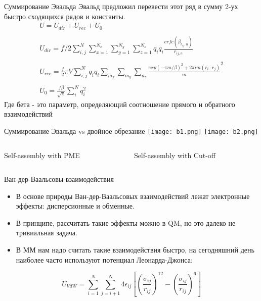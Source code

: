 \begin{frame}{Суммирование Эвальда}{}
Эвальд предложил перевести этот ряд в сумму 2-ух быстро сходящихся рядов и константы.
\[
    \begin{array}{l}
	U=U_{dir} + U_{rec} +U_0   \\
    \\
 U_{dir}=f/2 \sum_{i,j}^{N} \sum_{x=1}^{N_x}  \sum_{y=1}^{N_y}  \sum_{z=1}^{N_z} {q_i q_i \frac{erfc(\beta_{r_{ij},n})}{r_{ij,n}}}  \\
 \\
 U_{rec}= \frac{f}{2}\pi V \sum_{i,j}^{N}  q_i q_i \sum_{m_x} \sum_{m_y} \sum_{n_z} {\frac{exp(-\pi m/\beta )^2 +2 \pi i m (r_i \cdot r_j)}m^2} \\
 \\
U_0=\frac{f \beta}{\sqrt{\pi}} \sum_{i}^{N} q_{i}^2 
\end{array}
\]
Где бета - это параметр, определяющий соотношение прямого и обратного взаимодействий
\end{frame}


\begin{frame}{Суммирование Эвальда vs двойное обрезание}
\texttt{[image: b1.png]}
\texttt{[image: b2.png]}
\begin{columns}
\begin{column}{0.5\textwidth}
Self-assembly with PME
\end{column}
\begin{column}{0.5\textwidth} 
Self-assembly  with Cut-off
\end{column}
\end{columns}
\end{frame}

\begin{frame}{Ван-дер-Ваальсовы взаимодействия}
 \begin{itemize}
  \item
В основе природы Ван-дер-Ваальсовых взаимодействий лежат электронные эффекты: дисперсионные и обменные. 
\vspace{0.2cm}
  \item
В принципе, рассчитать такие эффекты можно в QM, но это далеко не тривиальная задача. 
\vspace{0.2cm}
  \item
В ММ нам надо считать такие взаимодействия быстро, на сегодняшний день наиболее часто используют потенциал Леонарда-Джонса:
\vspace{0.2cm}
  \end{itemize}

  \[ 
      U_{VdW}= \sum_{i=1}^N \sum_{j=i+1}^N  4\epsilon_{ij}  
      \left [ 
      \left ( \frac{\sigma_{ij}}{r_{ij}} \right )^{12} -
      \left ( \frac{\sigma_{ij}}{r_{ij}} \right )^6 
      \right ] 
  \]

\end{frame}


